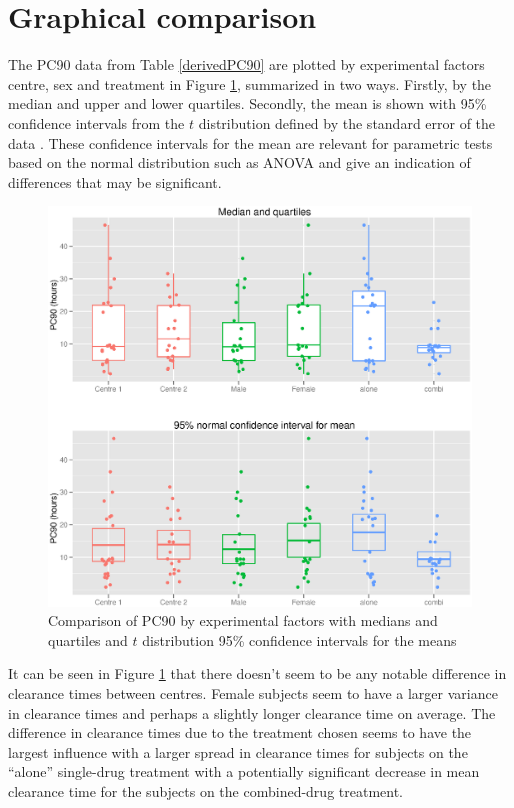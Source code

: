 \section{Graphical comparison}
The PC90 data from Table \ref{derivedPC90} are plotted by experimental factors centre, sex and treatment in Figure \ref{pc90boxes}, summarized in two ways. Firstly, by the median and upper and lower quartiles. Secondly, the mean is shown with 95\% confidence intervals from the $t$ distribution defined by the standard error of the data%
. These confidence intervals for the mean are relevant for parametric tests based on the normal distribution such as ANOVA and give an indication of differences that may be significant.
\begin{figure}[h]
\includegraphics[width=150mm]{pc90boxes.eps} 
\caption{Comparison of PC90 by experimental factors with medians and quartiles and $t$ distribution 95\% confidence intervals for the means}
\label{pc90boxes}
\end{figure}

It can be seen in Figure \ref{pc90boxes} that there doesn't seem to be any notable difference in clearance times between centres. Female subjects seem to have a larger variance in clearance times and perhaps a slightly longer clearance time on average. The difference in clearance times due to the treatment chosen seems to have the largest influence with a larger spread in clearance times for subjects on the ``alone'' single-drug treatment with a potentially significant decrease in mean clearance time for the subjects on the combined-drug treatment.

